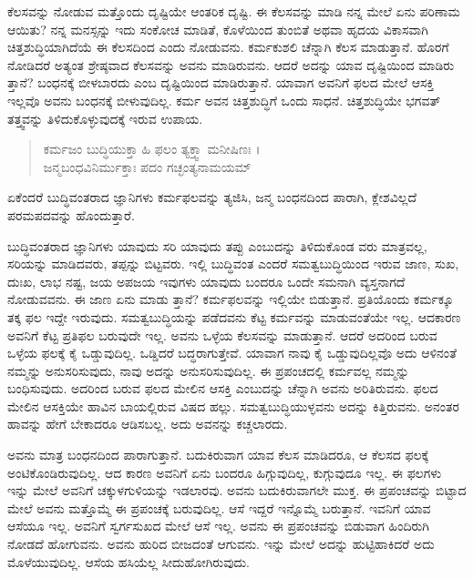 ಕೆಲಸವನ್ನು ನೋಡುವ ಮತ್ತೊಂದು ದೃಷ್ಟಿಯೇ ಆಂತರಿಕ ದೃಷ್ಟಿ. ಈ ಕೆಲಸವನ್ನು ಮಾಡಿ ನನ್ನ ಮೇಲೆ ಏನು ಪರಿಣಾಮ ಆಯಿತು? ನನ್ನ ಮನಸ್ಸನ್ನು ಇದು ಸಂಕೋಚ ಮಾಡಿತೆ, ಕೊಳೆಯಿಂದ ತುಂಬಿತೆ ಅಥವಾ ಹೃದಯ ವಿಕಾಸವಾಗಿ ಚಿತ್ತಶುದ್ಧಿಯಾಗಿದೆಯೆ ಈ ಕೆಲಸದಿಂದ ಎಂದು ನೋಡುವನು. ಕರ್ಮಕುಶಲಿ ಚೆನ್ನಾಗಿ ಕೆಲಸ ಮಾಡುತ್ತಾನೆ. ಹೊರಗೆ ನೋಡಿದರೆ ಅತ್ಯಂತ ಶ್ರೇಷ್ಠವಾದ ಕೆಲಸವನ್ನು ಅವನು ಮಾಡಿರುವನು. ಆದರೆ ಅದನ್ನು ಯಾವ ದೃಷ್ಟಿಯಿಂದ ಮಾಡಿರು ತ್ತಾನೆ? ಬಂಧನಕ್ಕೆ ಬೀಳಬಾರದು ಎಂಬ ದೃಷ್ಟಿಯಿಂದ ಮಾಡಿರುತ್ತಾನೆ. ಯಾವಾಗ ಅವನಿಗೆ ಫಲದ ಮೇಲೆ ಆಸಕ್ತಿ ಇಲ್ಲವೊ ಅವನು ಬಂಧನಕ್ಕೆ ಬೀಳುವುದಿಲ್ಲ. ಕರ್ಮ ಅವನ ಚಿತ್ತಶುದ್ಧಿಗೆ ಒಂದು ಸಾಧನೆ. ಚಿತ್ತಶುದ್ಧಿಯೇ ಭಗವತ್ ತತ್ತ್ವವನ್ನು ತಿಳಿದುಕೊಳ್ಳುವುದಕ್ಕೆ ಇರುವ ಉಪಾಯ.

\begin{verse}
ಕರ್ಮಜಂ ಬುದ್ಧಿಯುಕ್ತಾ ಹಿ ಫಲಂ ತ್ಯಕ್ತ್ವಾ ಮನೀಷಿಣಃ ।\\ಜನ್ಮಬಂಧವಿನಿರ್ಮುಕ್ತಾಃ ಪದಂ ಗಚ್ಛಂತ್ಯನಾಮಯಮ್ 
\end{verse}

{\small ಏಕೆಂದರೆ ಬುದ್ಧಿವಂತರಾದ ಜ್ಞಾನಿಗಳು ಕರ್ಮಫಲವನ್ನು ತ್ಯಜಿಸಿ, ಜನ್ಮ ಬಂಧನದಿಂದ ಪಾರಾಗಿ, ಕ್ಲೇಶವಿಲ್ಲದೆ ಪರಮಪದವನ್ನು ಹೊಂದುತ್ತಾರೆ.}

ಬುದ್ಧಿವಂತರಾದ ಜ್ಞಾನಿಗಳು ಯಾವುದು ಸರಿ ಯಾವುದು ತಪ್ಪು ಎಂಬುದನ್ನು ತಿಳಿದುಕೊಂಡ ವರು ಮಾತ್ರವಲ್ಲ, ಸರಿಯನ್ನು ಮಾಡಿದವರು, ತಪ್ಪನ್ನು ಬಿಟ್ಟವರು. ಇಲ್ಲಿ ಬುದ್ಧಿವಂತ ಎಂದರೆ ಸಮತ್ವಬುದ್ಧಿಯಿಂದ ಇರುವ ಜಾಣ, ಸುಖ, ದುಃಖ, ಲಾಭ ನಷ್ಟ, ಜಯ ಅಪಜಯ ಇವುಗಳು ಯಾವುದು ಬಂದರೂ ಒಂದೇ ಸಮನಾಗಿ ವ್ಯಸ್ತನಾಗದೆ ನೋಡುವವನು. ಈ ಜಾಣ ಏನು ಮಾಡು ತ್ತಾನೆ? ಕರ್ಮಫಲವನ್ನು ಇಲ್ಲಿಯೇ ಬಿಡುತ್ತಾನೆ. ಪ್ರತಿಯೊಂದು ಕರ್ಮಕ್ಕೂ ತಕ್ಕ ಫಲ ಇದ್ದೇ ಇರುವುದು. ಸಮತ್ವಬುದ್ಧಿಯನ್ನು ಪಡೆದವನು ಕೆಟ್ಟ ಕರ್ಮವನ್ನು ಮಾಡುವಂತೆಯೇ ಇಲ್ಲ. ಆದಕಾರಣ ಅವನಿಗೆ ಕೆಟ್ಟ ಪ್ರತಿಫಲ ಬರುವುದೇ ಇಲ್ಲ. ಅವನು ಒಳ್ಳೆಯ ಕೆಲಸವನ್ನು ಮಾಡುತ್ತಾನೆ. ಆದರೆ ಅದರಿಂದ ಬರುವ ಒಳ್ಳೆಯ ಫಲಕ್ಕೆ ಕೈ ಒಡ್ಡುವುದಿಲ್ಲ. ಒಡ್ಡಿದರೆ ಬದ್ಧರಾಗುತ್ತೇವೆ. ಯಾವಾಗ ನಾವು ಕೈ ಒಡ್ಡುವುದಿಲ್ಲವೊ ಅದು ಆಳಿನಂತೆ ನಮ್ಮನ್ನು ಅನುಸರಿಸುವುದು, ನಾವು ಅದನ್ನು ಅನುಸರಿಸುವುದಿಲ್ಲ. ಈ ಪ್ರಪಂಚದಲ್ಲಿ ಕರ್ಮವಲ್ಲ ನಮ್ಮನ್ನು ಬಂಧಿಸುವುದು. ಅದರಿಂದ ಬರುವ ಫಲದ ಮೇಲಿನ ಆಸಕ್ತಿ ಎಂಬುದನ್ನು ಚೆನ್ನಾಗಿ ಅವನು ಅರಿತಿರುವನು. ಫಲದ ಮೇಲಿನ ಆಸಕ್ತಿಯೇ ಹಾವಿನ ಬಾಯಲ್ಲಿರುವ ವಿಷದ ಹಲ್ಲು. ಸಮತ್ವಬುದ್ಧಿಯುಳ್ಳವನು ಅದನ್ನು ಕಿತ್ತಿರುವನು. ಅನಂತರ ಹಾವನ್ನು ಹೇಗೆ ಬೇಕಾದರೂ ಆಡಿಸಬಲ್ಲ. ಅದು ಅವನನ್ನು ಕಚ್ಚಲಾರದು.

ಅವನು ಮಾತ್ರ ಬಂಧನದಿಂದ ಪಾರಾಗುತ್ತಾನೆ. ಬದುಕಿರುವಾಗ ಯಾವ ಕೆಲಸ ಮಾಡಿದರೂ, ಆ ಕೆಲಸದ ಫಲಕ್ಕೆ ಅಂಟಿಕೊಂಡಿರುವುದಿಲ್ಲ. ಆದ ಕಾರಣ ಅವನಿಗೆ ಏನು ಬಂದರೂ ಹಿಗ್ಗುವುದಿಲ್ಲ, ಕುಗ್ಗುವುದೂ ಇಲ್ಲ. ಈ ಫಲಗಳು ಇನ್ನು ಮೇಲೆ ಅವನಿಗೆ ಚಕ್ಕುಳಗುಳಿಯನ್ನು ಇಡಲಾರವು. ಅವನು ಬದುಕಿರುವಾಗಲೇ ಮುಕ್ತ. ಈ ಪ್ರಪಂಚವನ್ನು ಬಿಟ್ಟಾದ ಮೇಲೆ ಅವನು ಮತ್ತೊಮ್ಮೆ ಈ ಪ್ರಪಂಚಕ್ಕೆ ಬರುವುದಿಲ್ಲ. ಆಸೆ ಇದ್ದರೆ ಇನ್ನೊಮ್ಮೆ ಬರುತ್ತಾನೆ. ಇವನಿಗೆ ಯಾವ ಆಸೆಯೂ ಇಲ್ಲ. ಅವನಿಗೆ ಸ್ವರ್ಗಸುಖದ ಮೇಲೆ ಆಸೆ ಇಲ್ಲ. ಅವನು ಈ ಪ್ರಪಂಚವನ್ನು ಬಿಡುವಾಗ ಹಿಂದಿರುಗಿ ನೋಡದೆ ಹೋಗುವನು. ಅವನು ಹುರಿದ ಬೀಜದಂತೆ ಆಗುವನು. ಇನ್ನು ಮೇಲೆ ಅದನ್ನು ಹುಟ್ಟಿಹಾಕಿದರೆ ಅದು ಮೊಳೆಯುವುದಿಲ್ಲ. ಆಸೆಯ ಹಸಿಯೆಲ್ಲ ಸೀದುಹೋಗಿರುವುದು.

